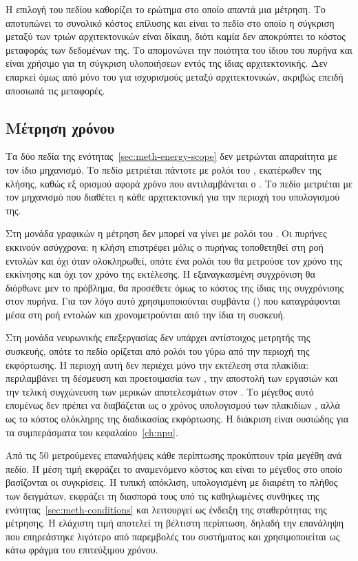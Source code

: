 Η επιλογή του πεδίου καθορίζει το ερώτημα στο οποίο απαντά μια μέτρηση. Το
 αποτυπώνει το συνολικό κόστος επίλυσης και είναι το πεδίο στο
οποίο η σύγκριση μεταξύ των τριών αρχιτεκτονικών είναι δίκαιη, διότι καμία δεν
αποκρύπτει το κόστος μεταφοράς των δεδομένων της. Το  απομονώνει την
ποιότητα του ίδιου του πυρήνα και είναι χρήσιμο για τη σύγκριση υλοποιήσεων
εντός της ίδιας αρχιτεκτονικής. Δεν επαρκεί όμως από μόνο του για ισχυρισμούς
μεταξύ αρχιτεκτονικών, ακριβώς επειδή αποσιωπά τις μεταφορές.

\subsection{Μέτρηση χρόνου}
\label{sec:meth-timing}

Τα δύο πεδία της ενότητας~\ref{sec:meth-energy-scope} δεν μετρώνται
απαραίτητα με τον ίδιο μηχανισμό. Το πεδίο  μετριέται πάντοτε με
ρολόι του , εκατέρωθεν της κλήσης, καθώς εξ ορισμού αφορά χρόνο που
αντιλαμβάνεται ο . Το πεδίο  μετριέται με τον μηχανισμό που
διαθέτει η κάθε αρχιτεκτονική για την περιοχή του υπολογισμού της.

Στη μονάδα γραφικών η μέτρηση δεν μπορεί να γίνει με ρολόι του . Οι
πυρήνες εκκινούν ασύγχρονα: η κλήση επιστρέφει μόλις ο πυρήνας τοποθετηθεί στη
ροή εντολών και όχι όταν ολοκληρωθεί, οπότε ένα ρολόι του  θα μετρούσε
τον χρόνο της εκκίνησης και όχι τον χρόνο της εκτέλεσης. Η εξαναγκασμένη
συγχρόνιση θα διόρθωνε μεν το πρόβλημα, θα προσέθετε όμως το κόστος της ίδιας
της συγχρόνισης στον πυρήνα. Για τον λόγο αυτό χρησιμοποιούνται συμβάντα
() που καταγράφονται μέσα στη ροή εντολών και χρονομετρούνται από την
ίδια τη συσκευή.

Στη μονάδα νευρωνικής επεξεργασίας δεν υπάρχει αντίστοιχος μετρητής της
συσκευής, οπότε το πεδίο  ορίζεται από ρολόι του  γύρω από την
περιοχή της εκφόρτωσης. Η περιοχή αυτή δεν περιέχει μόνο την εκτέλεση στα
πλακίδια: περιλαμβάνει τη δέσμευση και προετοιμασία των , την
αποστολή των εργασιών και την τελική συγχώνευση των μερικών αποτελεσμάτων στον
. Το μέγεθος αυτό επομένως δεν πρέπει να διαβάζεται ως ο χρόνος
υπολογισμού των πλακιδίων , αλλά ως το κόστος ολόκληρης της διαδικασίας
εκφόρτωσης. Η διάκριση είναι ουσιώδης για τα συμπεράσματα του
κεφαλαίου~\ref{ch:npu}.

Από τις 50 μετρούμενες επαναλήψεις κάθε περίπτωσης προκύπτουν τρία μεγέθη ανά
πεδίο. Η μέση τιμή εκφράζει το αναμενόμενο κόστος και είναι το μέγεθος στο οποίο
βασίζονται οι συγκρίσεις. Η τυπική απόκλιση, υπολογισμένη με διαιρέτη το πλήθος
των δειγμάτων, εκφράζει τη διασπορά τους υπό τις καθηλωμένες συνθήκες της
ενότητας~\ref{sec:meth-conditions} και λειτουργεί ως ένδειξη της σταθερότητας
της μέτρησης. Η ελάχιστη τιμή αποτελεί τη βέλτιστη περίπτωση, δηλαδή την
επανάληψη που επηρεάστηκε λιγότερο από παρεμβολές του συστήματος και
χρησιμοποιείται ως κάτω φράγμα του επιτεύξιμου χρόνου.

